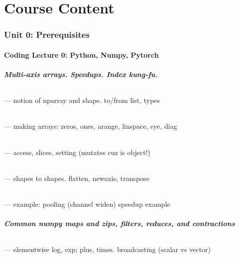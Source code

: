 \documentclass[12pt]{article}
\begin{document}
    \newpage

\part{Course Content}
  \section*{\sc Unit 0: Prerequisites}
    \subsection*{Coding Lecture 0: Python, Numpy, Pytorch}
      \subsubsection*{Multi-axis arrays.  Speedups.  Index kung-fu.}
        \paragraph{\sf} --- notion of nparray and shape.  to/from list, types
        \paragraph{\sf} --- making arrays: zeros, ones, arange, linspace, eye, diag
        \paragraph{\sf} --- access, slices, setting (mutates cuz is object!)
        \paragraph{\sf} --- shapes to shapes.  flatten, newaxis, transpose
        \paragraph{\sf} --- example: pooling (channel widen) speedup example

      \subsubsection*{Common numpy maps and zips, filters, reduces, and contractions}
        \paragraph{\sf} --- elementwise log, exp; plus, times.  broadcasting (scalar vs vector)
\end{document}

